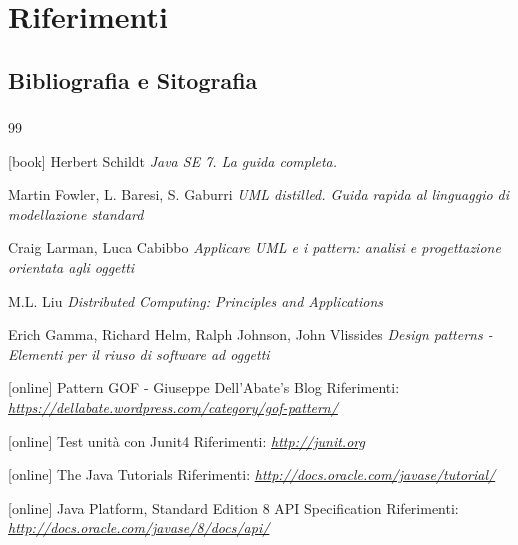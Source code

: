 \section {Riferimenti}
\subsection {Bibliografia e Sitografia}
\begin {frame} [allowframebreaks] 
 \frametitle {\refname}
  \begin {thebibliography}{99}
   {\tiny 
     [book]
      Herbert Schildt
     \newblock \emph{Java SE 7. La guida completa.} 

       Martin Fowler, L. Baresi, S. Gaburri 
     \newblock \emph{UML distilled. Guida rapida al linguaggio di modellazione standard} 

      Craig Larman, Luca Cabibbo
     \newblock \emph{Applicare UML e i pattern: analisi e progettazione orientata agli oggetti} 

      M.L. Liu
     \newblock \emph{Distributed Computing: Principles and Applications} 

      Erich Gamma, Richard Helm, Ralph Johnson, John Vlissides
     \newblock \emph{Design patterns - Elementi per il riuso di software ad oggetti} 
      
     [online]
      Pattern GOF - Giuseppe Dell'Abate's Blog
     \newblock Riferimenti: \emph{\url{https://dellabate.wordpress.com/category/gof-pattern/ }}

     [online]
      Test unità con Junit4
     \newblock Riferimenti: \emph{\url{http://junit.org }}

     [online]
      The Java Tutorials 
     \newblock Riferimenti: \emph{\url{http://docs.oracle.com/javase/tutorial/ }}

     [online]
      Java Platform, Standard Edition 8 API Specification 
     \newblock Riferimenti: \emph{\url{http://docs.oracle.com/javase/8/docs/api/ }}

}
\end{thebibliography}
\end{frame}

